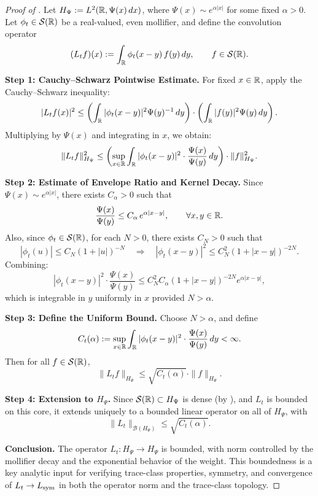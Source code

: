 \begin{proof}[Proof of ]
Let \( H_\Psi := L^2(\mathbb{R}, \Psi(x)\, dx) \), where \( \Psi(x) \sim e^{\alpha |x|} \) for some fixed \( \alpha > 0 \). Let \( \phi_t \in \mathcal{S}(\mathbb{R}) \) be a real-valued, even mollifier, and define the convolution operator
\[
(L_t f)(x) := \int_{\mathbb{R}} \phi_t(x - y)\, f(y)\, dy, \qquad f \in \mathcal{S}(\mathbb{R}).
\]

\medskip
\noindent\textbf{Step 1: Cauchy--Schwarz Pointwise Estimate.}
For fixed \( x \in \mathbb{R} \), apply the Cauchy--Schwarz inequality:
\[
|L_t f(x)|^2 \le \left( \int_{\mathbb{R}} |\phi_t(x - y)|^2 \Psi(y)^{-1}\, dy \right)
                \cdot \left( \int_{\mathbb{R}} |f(y)|^2 \Psi(y)\, dy \right).
\]
Multiplying by \( \Psi(x) \) and integrating in \( x \), we obtain:
\[
\| L_t f \|_{H_\Psi}^2 \le \left( \sup_{x \in \mathbb{R}} \int_{\mathbb{R}} |\phi_t(x - y)|^2 \cdot \frac{\Psi(x)}{\Psi(y)}\, dy \right) \cdot \| f \|_{H_\Psi}^2.
\]

\medskip
\noindent\textbf{Step 2: Estimate of Envelope Ratio and Kernel Decay.}
Since \( \Psi(x) \sim e^{\alpha |x|} \), there exists \( C_\alpha > 0 \) such that
\[
\frac{\Psi(x)}{\Psi(y)} \le C_\alpha\, e^{\alpha |x - y|}, \qquad \forall x, y \in \mathbb{R}.
\]
Also, since \( \phi_t \in \mathcal{S}(\mathbb{R}) \), for each \( N > 0 \), there exists \( C_N > 0 \) such that
\[
|\phi_t(u)| \le C_N (1 + |u|)^{-N} \quad \Rightarrow \quad |\phi_t(x - y)|^2 \le C_N^2 (1 + |x - y|)^{-2N}.
\]
Combining:
\[
|\phi_t(x - y)|^2 \cdot \frac{\Psi(x)}{\Psi(y)} \le C_N^2 C_\alpha (1 + |x - y|)^{-2N} e^{\alpha |x - y|},
\]
which is integrable in \( y \) uniformly in \( x \) provided \( N > \alpha \).

\medskip
\noindent\textbf{Step 3: Define the Uniform Bound.}
Choose \( N > \alpha \), and define
\[
C_t(\alpha) := \sup_{x \in \mathbb{R}} \int_{\mathbb{R}} |\phi_t(x - y)|^2 \cdot \frac{\Psi(x)}{\Psi(y)}\, dy < \infty.
\]
Then for all \( f \in \mathcal{S}(\mathbb{R}) \),
\[
\| L_t f \|_{H_\Psi} \le \sqrt{C_t(\alpha)} \cdot \| f \|_{H_\Psi}.
\]

\medskip
\noindent\textbf{Step 4: Extension to \( H_\Psi \).}
Since \( \mathcal{S}(\mathbb{R}) \subset H_\Psi \) is dense (by ), and \( L_t \) is bounded on this core, it extends uniquely to a bounded linear operator on all of \( H_\Psi \), with
\[
\| L_t \|_{\mathcal{B}(H_\Psi)} \le \sqrt{C_t(\alpha)}.
\]

\medskip
\noindent\textbf{Conclusion.}
The operator \( L_t \colon H_\Psi \to H_\Psi \) is bounded, with norm controlled by the mollifier decay and the exponential behavior of the weight. This boundedness is a key analytic input for verifying trace-class properties, symmetry, and convergence of \( L_t \to L_{\mathrm{sym}} \) in both the operator norm and the trace-class topology.
\end{proof}
